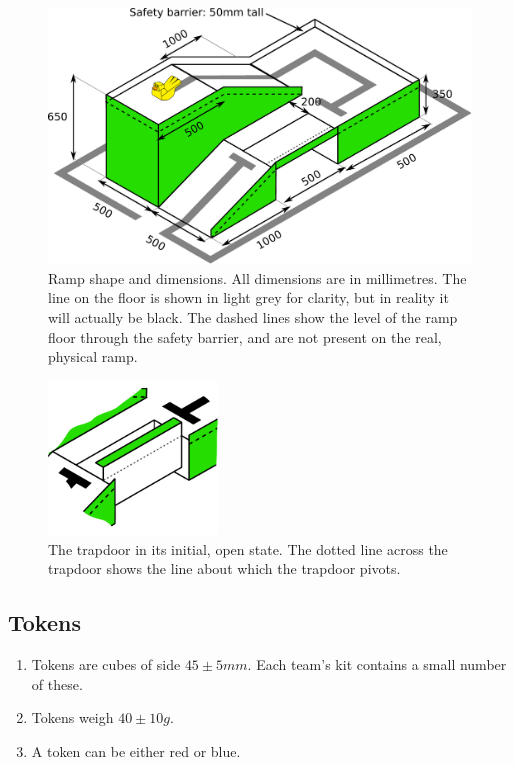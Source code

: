 \begin{figure}
  \includegraphics[keepaspectratio,width=\textwidth]{./images/ramp.pdf}
  \caption{\label{fig:ramp-dim}Ramp shape and dimensions.  All dimensions are in millimetres.  The line on the floor is shown in light grey for clarity, but in reality it will actually be black.  The dashed lines show the level of the ramp floor through the safety barrier, and are not present on the real, physical ramp.}
\end{figure}

\begin{figure}
  \begin{center}
    \includegraphics[keepaspectratio,width=0.4\textwidth]{./images/trapdoor-start.pdf}
  \end{center}
  \caption{\label{fig:trapdoor-open}The trapdoor in its initial, open state.  The dotted line across the trapdoor shows the line about which the trapdoor pivots.}
\end{figure}

\subsection{Tokens}
\label{tokens}
\begin {enumerate} 
\item Tokens are cubes of side $45\pm5mm$.
 Each team's kit contains a small number of these.
\item Tokens weigh $40\pm10g$.
\item A token can be either red or blue.
\end {enumerate}

